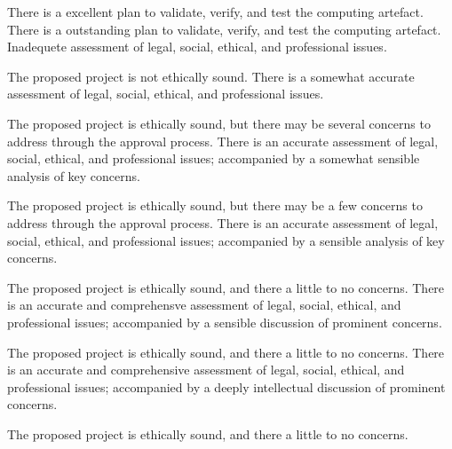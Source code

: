 \begin{markingrubric}
        \grade 		There is a excellent plan to validate, verify, and test the computing artefact.
        \grade 		There is a outstanding plan to validate, verify, and test the computing artefact.    
        \grade\fail 	Inadequete assessment of legal, social, ethical, and professional issues.
         \par		The proposed project is not ethically sound.
        \grade 		There is a somewhat accurate assessment of legal, social, ethical, and professional issues.
        \par		The proposed project is ethically sound, but there may be several concerns to address through the approval process.
        \grade 		There is an accurate assessment of legal, social, ethical, and professional issues; accompanied by a somewhat sensible analysis of key concerns.
        \par		The proposed project is ethically sound, but there may be a few concerns to address through the approval process.
        \grade 		There is an accurate assessment of legal, social, ethical, and professional issues; accompanied by a sensible analysis of key concerns.
        \par		The proposed project is ethically sound, and there a little to no concerns.
        \grade 		There is an accurate and comprehensve assessment of legal, social, ethical, and professional issues; accompanied by a sensible discussion of prominent concerns.
        \par		The proposed project is ethically sound, and there a little to no concerns.
        \grade 		There is an accurate and comprehensive assessment of legal, social, ethical, and professional issues; accompanied by a deeply intellectual discussion of prominent concerns.
        \par		The proposed project is ethically sound, and there a little to no concerns.
%
\end{markingrubric}

	
